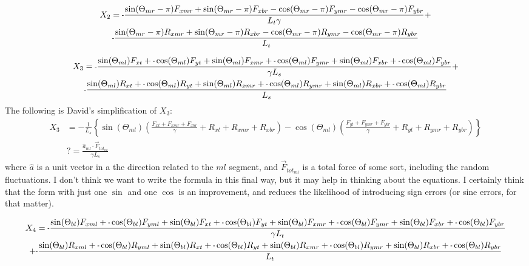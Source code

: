 \documentclass[11pt, landscape]{article}
\newcommand{\mn}{\scalebox{0.7}[1.0]{-}}
\begin{document}
\begin{multline}
  X_2 = \mn\frac{\sin(\Theta_{mr}-\pi)F_{xmr} + \sin(\Theta_{mr}-\pi)F_{xbr} - \cos(\Theta_{mr}-\pi)F_{ymr} - \cos(\Theta_{mr}-\pi)F_{ybr}}{L_{t}\gamma} + \\
  \mn\frac{\sin(\Theta_{mr}-\pi)R_{xmr} + \sin(\Theta_{mr}-\pi)R_{xbr} - \cos(\Theta_{mr}-\pi)R_{ymr} - \cos(\Theta_{mr}-\pi)R_{ybr}}{L_{t}}
\end{multline}

\begin{multline}
  X_3 = \mn \frac{\sin(\Theta_{ml})F_{xt } + \mn \cos(\Theta_{ml})F_{yt } + \sin(\Theta_{ml})F_{xmr} + \mn \cos(\Theta_{ml})F_{ymr} + \sin(\Theta_{ml})F_{xbr} + \mn \cos(\Theta_{ml})F_{ybr}}{\gamma L_s} + \\
	\mn \frac{\sin(\Theta_{ml})R_{xt } + \mn \cos(\Theta_{ml})R_{yt } + \sin(\Theta_{ml})R_{xmr} + \mn \cos(\Theta_{ml})R_{ymr} + \sin(\Theta_{ml})R_{xbr} + \mn \cos(\Theta_{ml})R_{ybr}}{L_s}
\end{multline}
The following is David's simplification of $X_3$:
\begin{align}
  X_3 &= -\frac{1}{L_s}\left\{ \sin(\Theta_{ml})\left(\frac{F_{xt}+F_{xmr}+F_{xbr}}{\gamma} + R_{xt }+R_{xmr}+R_{xbr}\right) -
    \cos(\Theta_{ml})\left(\frac{F_{yt }+F_{ymr}+F_{ybr}}{\gamma} +
    R_{yt}+R_{ymr}+R_{ybr}\right) \right\}
    \\
    &?= \frac{\hat{a}_{ml}\cdot \vec{F}_{tot_{ml}}}{\gamma L_s}
\end{align}
where $\hat a$ is a unit vector in a the direction related to the $ml$
segment, and $\vec{F}_{tot_{ml}}$ is a total force of some sort,
including the random fluctuations.  I don't think we want to write the
formula in this final way, but it may help in thinking about the
equations.  I certainly think that the form with just one $\sin$ and
one $\cos$ is an improvement, and reduces the likelihood of
introducing sign errors (or sine errors, for that matter).

\begin{multline}
  X_4 = \mn \frac{\sin(\Theta_{bl})F_{xml} + \mn\cos(\Theta_{bl})F_{yml} + \sin(\Theta_{bl})F_{xt } + \mn \cos(\Theta_{bl})F_{yt } + \sin(\Theta_{bl})F_{xmr} + \mn \cos(\Theta_{bl})F_{ymr} + \sin(\Theta_{bl})F_{xbr} + \mn \cos(\Theta_{bl})F_{ybr}}
  {\gamma L_t} \\+ \mn \frac{\sin(\Theta_{bl})R_{xml} +\mn \cos(\Theta_{bl})R_{yml} + \sin(\Theta_{bl})R_{xt } + \mn \cos(\Theta_{bl})R_{yt} + \sin(\Theta_{bl})R_{xmr} + \mn \cos(\Theta_{bl})R_{ymr} + \sin(\Theta_{bl})R_{xbr} + \mn \cos(\Theta_{bl})R_{ybr}}{L_t} \\
\end{multline}
\end{document}
